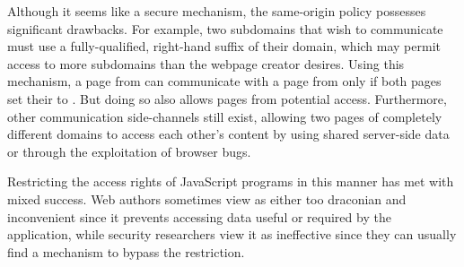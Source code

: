 \begin{table}[ht]
\centering
{}
\caption{Results of comparison to \url{http://store.company.com/dir/page.html} using the Same Origin Policy~\cite{sop}.}
\label{tab:same-origin}
\end{table}

Although it seems like a secure mechanism, the same-origin policy possesses significant drawbacks.
For example, two subdomains that wish to communicate must use a fully-qualified, right-hand suffix of their domain, which may permit access to more subdomains than the webpage creator desires.
Using this mechanism, a page from  can communicate with a page from  only if both pages set their  to .
But doing so also allows pages from  potential access.
Furthermore, other communication side-channels still exist, allowing two pages of completely different domains to access each other's content by using shared server-side data or through the exploitation of browser bugs.

Restricting the access rights of JavaScript programs in this manner has met with mixed success.
Web authors sometimes view as either too draconian and inconvenient since it prevents accessing data useful or required by the application, while security researchers view it as ineffective since they can usually find a mechanism to bypass the restriction.

